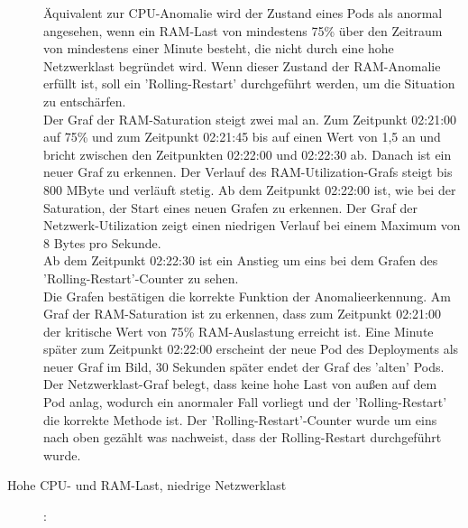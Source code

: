 \documentclass[a4paper,10pt]{scrartcl}
\begin{document}
\begin{description}
Äquivalent zur CPU-Anomalie wird der Zustand eines Pods als anormal angesehen, wenn ein RAM-Last von mindestens 75\% über den Zeitraum von mindestens einer Minute besteht, die nicht durch eine hohe Netzwerklast begründet wird. Wenn dieser Zustand  der RAM-Anomalie erfüllt ist, soll ein 'Rolling-Restart' durchgeführt werden, um die Situation zu entschärfen.\\
Der Graf der RAM-Saturation steigt zwei mal an. Zum Zeitpunkt 02:21:00 auf 75\% und zum Zeitpunkt 02:21:45 bis auf einen Wert von 1,5 an und bricht zwischen den Zeitpunkten 02:22:00 und 02:22:30 ab. Danach ist ein neuer Graf zu erkennen.
Der Verlauf des RAM-Utilization-Grafs steigt bis 800 MByte und verläuft stetig. Ab dem Zeitpunkt 02:22:00 ist, wie bei der Saturation, der Start eines neuen Grafen zu erkennen.
Der Graf der Netzwerk-Utilization zeigt einen niedrigen Verlauf bei einem Maximum von 8 Bytes pro Sekunde.\\
Ab dem Zeitpunkt 02:22:30 ist ein Anstieg um eins bei dem Grafen des 'Rolling-Restart'-Counter zu sehen.\\
Die Grafen bestätigen die korrekte Funktion der Anomalieerkennung. Am Graf der RAM-Saturation ist zu erkennen, dass zum Zeitpunkt 02:21:00 der kritische Wert von 75\% RAM-Auslastung erreicht ist. Eine Minute später zum Zeitpunkt 02:22:00 erscheint der neue Pod des Deployments als neuer Graf im Bild, 30 Sekunden später endet der Graf des 'alten' Pods. Der Netzwerklast-Graf belegt, dass keine hohe Last von außen auf dem Pod anlag, wodurch ein anormaler Fall vorliegt und der 'Rolling-Restart' die korrekte Methode ist.
Der 'Rolling-Restart'-Counter wurde um eins nach oben gezählt was nachweist, dass der Rolling-Restart durchgeführt wurde. 
\pagebreak

\item[Hohe CPU- und RAM-Last, niedrige Netzwerklast]:\\


\end{description}
\end{document}
